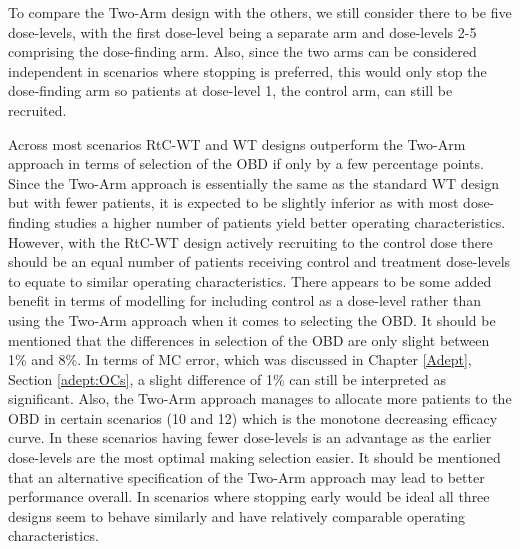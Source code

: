 To compare the Two-Arm design with the others, we still consider there to be five dose-levels, with the first dose-level being a separate arm and dose-levels 2-5 comprising the dose-finding arm. Also, since the two arms can be considered independent in scenarios where stopping is preferred, this would only stop the dose-finding arm so patients at dose-level 1, the control arm, can still be recruited.   

Across most scenarios RtC-WT and WT designs outperform the Two-Arm approach in terms of selection of the OBD if only by a few percentage points. Since the Two-Arm approach is essentially the same as the standard WT design but with fewer patients, it is expected to be slightly inferior as with most dose-finding studies a higher number of patients yield better operating characteristics. However, with the RtC-WT design actively recruiting to the control dose there should be an equal number of patients receiving control and treatment dose-levels to equate to similar operating characteristics. There appears to be some added benefit in terms of modelling for including control as a dose-level rather than using the Two-Arm approach when it comes to selecting the OBD. It should be mentioned that the differences in selection of the OBD are only slight between 1\% and 8\%. In terms of MC error, which was discussed in Chapter \ref{Adept}, Section \ref{adept:OCs}, a slight difference of 1\% can still be interpreted as significant. Also, the Two-Arm approach manages to allocate more patients to the OBD in certain scenarios (10 and 12) which is the monotone decreasing efficacy curve. In these scenarios having fewer dose-levels is an advantage as the earlier dose-levels are the most optimal making selection easier. It should be mentioned that an alternative specification of the Two-Arm approach may lead to better performance overall. In scenarios where stopping early would be ideal all three designs seem to behave similarly and have relatively comparable operating characteristics. 

